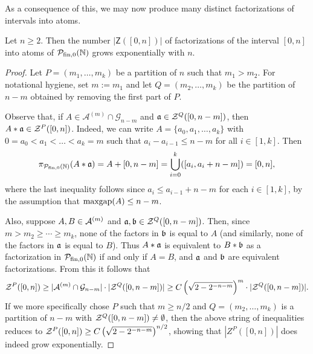 As a consequence of this, we may now produce many distinct factorizations of intervals into atoms.

\begin{thm} \label{thm:exponential intervals}
Let $n\ge 2$.
Then the number $|\mathsf{Z}([0,n])|$ of factorizations of the interval $[0,n]$ into atoms of $\PN$ grows exponentially with $n$.
\end{thm}

\begin{proof}
Let $P = (m_1,\dots, m_k)$ be a partition of $n$ such that $m_1 > m_2$.
For notational hygiene, set $m:= m_1$ and let $Q = (m_2,\dots, m_k)$ be the partition of $n-m$ obtained by removing the first part of $P$.

Observe that, if $A\in \mathcal{A}^{(m)}\cap \mathcal{G}_{n-m}$ and $\aa\in \Z^Q([0,n-m])$, then $A*\aa\in \Z^P([0,n])$.
Indeed, we can write $A = \{a_0,a_1,\dots, a_k\}$ with $0 =a_0 < a_1 <\dots < a_k = m$ such that $a_i - a_{i-1} \le n-m$ for all $i\in[1,k]$.
Then 
\[\pi_\PN(A*\aa) = A + [0,n-m] = \bigcup_{i=0}^k ([a_i,a_i+n-m]) = [0,n], \]
where the last inequality follows since $a_i \le a_{i-1} + n-m$ for each $i\in [1,k]$, by the assumption that $\maxgap(A) \le n-m$.

Also, suppose $A,B\in \A^{(m)}$ and $\aa,\bb\in \Z^Q([0,n-m])$.
Then, since $m > m_2 \ge \cdots \ge m_k$, none of the factors in $\bb$ is equal to $A$ (and similarly, none of the factors in $\aa$ is equal to $B$).
Thus $A*\aa$ is equivalent to $B*\bb$ as a factorization in $\PN$ if and only if $A=B$, and $\aa$ and $\bb$ are equivalent factorizations. 
From this it follows that
\[ \Z^{P}([0,n]) \ge |\A^{(m)}\cap \mathcal{G}_{n-m}| \cdot |\Z^Q([0,n-m])| \ge C\left(\sqrt{2-2^{-n-m}}\right)^m \cdot |\Z^Q([0,n-m])|.\]
If we more specifically chose $P$ such that $m\ge n/2$ and $Q = (m_2,\dots,m_k)$ is a partition of $n-m$ with $\Z^Q([0,n-m])\neq \emptyset$, then the above string of inequalities reduces to $\Z^{P}([0,n])\ge C\left(\sqrt{2-2^{-n-m}}\right)^{n/2}$, showing that $|Z^{P}([0,n])|$ does indeed grow exponentially.
\end{proof}